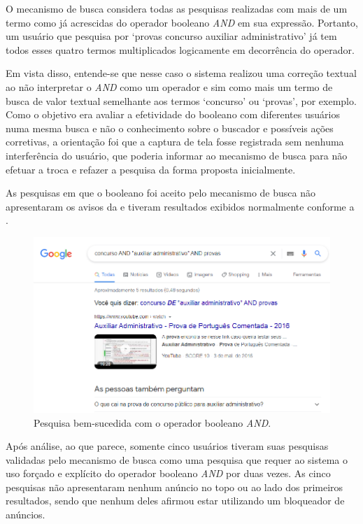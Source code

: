 \documentclass[portuguese]{textolivre}
\begin{document}
O mecanismo de busca considera todas as pesquisas realizadas com mais de um termo como já acrescidas do operador booleano \textit{AND} em sua expressão. Portanto, um usuário que pesquisa por ‘provas concurso auxiliar administrativo’ já tem todos esses quatro termos multiplicados logicamente em decorrência do operador.

Em vista disso, entende-se que nesse caso o sistema realizou uma correção textual ao não interpretar o \textit{AND} como um operador e sim como mais um termo de busca de valor textual semelhante aos termos ‘concurso’ ou ‘provas’, por exemplo. Como o objetivo era avaliar a efetividade do booleano com diferentes usuários numa mesma busca e não o conhecimento sobre o buscador e possíveis ações corretivas, a orientação foi que a captura de tela fosse registrada sem nenhuma interferência do usuário, que poderia informar ao mecanismo de busca para não efetuar a troca e refazer a pesquisa da forma proposta inicialmente.

As pesquisas em que o booleano foi aceito pelo mecanismo de busca não apresentaram os avisos da  e tiveram resultados exibidos normalmente conforme a .

\begin{figure}[h!]
    \centering
    \includegraphics[width=0.8\linewidth]{fig-013.png}
    \caption{Pesquisa bem-sucedida com o operador booleano \textit{AND}.}
    \label{fig17}
\end{figure}

Após análise, ao que parece, somente cinco usuários tiveram suas pesquisas validadas pelo mecanismo de busca como uma pesquisa que requer ao sistema o uso forçado e explícito do operador booleano \textit{AND} por duas vezes. As cinco pesquisas não apresentaram nenhum anúncio no topo ou ao lado dos primeiros resultados, sendo que nenhum deles afirmou estar utilizando um bloqueador de anúncios.
\end{document}
